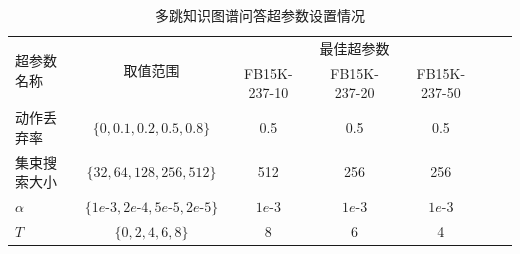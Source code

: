 \documentclass[algorithmlist, AutoFakeBold, AutoFakeSlant, figurelist, tablelist, nomlist, engineering]{seuthesix}
\begin{document}
\begin{table}[]
  \centering
  \begin{tabular*}{0.95\textwidth}{@{\extracolsep{\fill}}lcccccc}
  \toprule[1pt]
  \multirow{2}{*}{超参数名称} & \multirow{2}{*}{取值范围} & \multicolumn{3}{c}{最佳超参数}\\ 
    &  & \small{FB15K-237-10} & \small{FB15K-237-20} & \small{FB15K-237-50} \\ \hline
  动作丢弃率 & $\{0, 0.1, 0.2, 0.5, 0.8\}$ & 0.5 & 0.5 & 0.5 \\
  集束搜索大小 & $\{32, 64, 128, 256, 512\}$ & 512 & 256 & 256 \\
  $\alpha$ & $\{1e\text{-}3, 2e\text{-}4, 5e\text{-}5, 2e\text{-}5\}$ & $1e\text{-}3$ & $1e\text{-}3$ & $1e\text{-}3$ \\
  $T$ & $\{0, 2, 4, 6, 8\}$ & 8 & 6 & 4 \\
  \bottomrule[1pt]
  \end{tabular*}
  \caption{多跳知识图谱问答超参数设置情况}
  \label{Hyperparameters2_Multihop}
\end{table}

\end{document}
